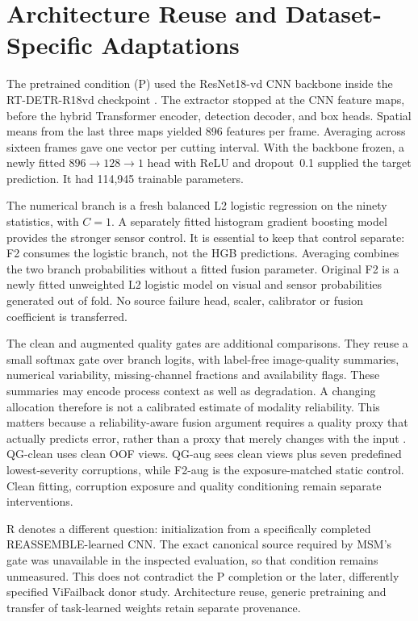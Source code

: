 \section{Architecture Reuse and Dataset-Specific Adaptations}
The pretrained condition (P) used the ResNet18-vd CNN backbone inside the RT-DETR-R18vd
checkpoint \citep{Zhao2024RTDETR}. The extractor stopped at the CNN feature maps, before
the hybrid Transformer encoder, detection decoder, and box heads. Spatial means from the
last three maps yielded 896 features per frame. Averaging across sixteen frames gave one
vector per cutting interval. With the backbone frozen, a newly fitted
$896\rightarrow128\rightarrow1$ head with ReLU and dropout~0.1 supplied the target
prediction. It had 114,945 trainable parameters.

The numerical branch is a fresh balanced L2 logistic regression on the ninety
statistics, with $C=1$. A separately fitted histogram gradient boosting model provides
the stronger sensor control. It is essential to keep that control separate: F2 consumes
the logistic branch, not the HGB predictions. Averaging combines the two branch
probabilities without a fitted fusion parameter. Original F2 is a newly fitted
unweighted L2 logistic model on visual and sensor probabilities generated out of fold.
No source failure head, scaler, calibrator or fusion coefficient is transferred.

The clean and augmented quality gates are additional comparisons. They reuse a small
softmax gate over branch logits, with label-free image-quality summaries, numerical
variability, missing-channel fractions and availability flags. These summaries may
encode process context as well as degradation. A changing allocation therefore is not a
calibrated estimate of modality reliability. This matters because a reliability-aware
fusion argument requires a quality proxy that actually predicts error, rather than a
proxy that merely changes with the input \citep{Zhang2023QMF}. QG-clean uses clean OOF
views. QG-aug sees clean views plus seven predefined lowest-severity corruptions, while
F2-aug is the exposure-matched static control. Clean fitting, corruption exposure and
quality conditioning remain separate interventions.

R denotes a different question: initialization from a specifically completed
REASSEMBLE-learned CNN. The exact canonical source required by MSM's gate was
unavailable in the inspected evaluation, so that condition remains unmeasured. This does
not contradict the P completion or the later, differently specified ViFailback donor
study. Architecture reuse, generic pretraining and transfer of task-learned weights
retain separate provenance.

